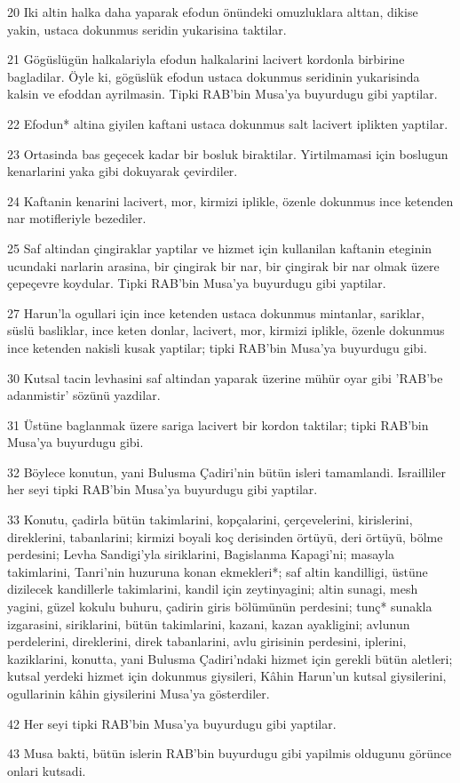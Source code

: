 \par 20 Iki altin halka daha yaparak efodun önündeki omuzluklara alttan, dikise yakin, ustaca dokunmus seridin yukarisina taktilar.
\par 21 Gögüslügün halkalariyla efodun halkalarini lacivert kordonla birbirine bagladilar. Öyle ki, gögüslük efodun ustaca dokunmus seridinin yukarisinda kalsin ve efoddan ayrilmasin. Tipki RAB'bin Musa'ya buyurdugu gibi yaptilar.
\par 22 Efodun* altina giyilen kaftani ustaca dokunmus salt lacivert iplikten yaptilar.
\par 23 Ortasinda bas geçecek kadar bir bosluk biraktilar. Yirtilmamasi için boslugun kenarlarini yaka gibi dokuyarak çevirdiler.
\par 24 Kaftanin kenarini lacivert, mor, kirmizi iplikle, özenle dokunmus ince ketenden nar motifleriyle bezediler.
\par 25 Saf altindan çingiraklar yaptilar ve hizmet için kullanilan kaftanin eteginin ucundaki narlarin arasina, bir çingirak bir nar, bir çingirak bir nar olmak üzere çepeçevre koydular. Tipki RAB'bin Musa'ya buyurdugu gibi yaptilar.
\par 27 Harun'la ogullari için ince ketenden ustaca dokunmus mintanlar, sariklar, süslü basliklar, ince keten donlar, lacivert, mor, kirmizi iplikle, özenle dokunmus ince ketenden nakisli kusak yaptilar; tipki RAB'bin Musa'ya buyurdugu gibi.
\par 30 Kutsal tacin levhasini saf altindan yaparak üzerine mühür oyar gibi 'RAB'be adanmistir' sözünü yazdilar.
\par 31 Üstüne baglanmak üzere sariga lacivert bir kordon taktilar; tipki RAB'bin Musa'ya buyurdugu gibi.
\par 32 Böylece konutun, yani Bulusma Çadiri'nin bütün isleri tamamlandi. Israilliler her seyi tipki RAB'bin Musa'ya buyurdugu gibi yaptilar.
\par 33 Konutu, çadirla bütün takimlarini, kopçalarini, çerçevelerini, kirislerini, direklerini, tabanlarini; kirmizi boyali koç derisinden örtüyü, deri örtüyü, bölme perdesini; Levha Sandigi'yla siriklarini, Bagislanma Kapagi'ni; masayla takimlarini, Tanri'nin huzuruna konan ekmekleri*; saf altin kandilligi, üstüne dizilecek kandillerle takimlarini, kandil için zeytinyagini; altin sunagi, mesh yagini, güzel kokulu buhuru, çadirin giris bölümünün perdesini; tunç* sunakla izgarasini, siriklarini, bütün takimlarini, kazani, kazan ayakligini; avlunun perdelerini, direklerini, direk tabanlarini, avlu girisinin perdesini, iplerini, kaziklarini, konutta, yani Bulusma Çadiri'ndaki hizmet için gerekli bütün aletleri; kutsal yerdeki hizmet için dokunmus giysileri, Kâhin Harun'un kutsal giysilerini, ogullarinin kâhin giysilerini Musa'ya gösterdiler.
\par 42 Her seyi tipki RAB'bin Musa'ya buyurdugu gibi yaptilar.
\par 43 Musa bakti, bütün islerin RAB'bin buyurdugu gibi yapilmis oldugunu görünce onlari kutsadi.

